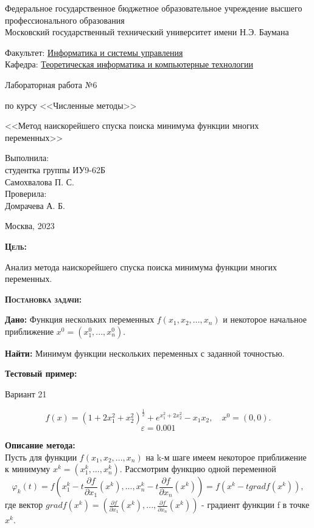 \documentclass [12pt]{article}
\title{}
\date{}
\author{}
\begin{document}
\begin{titlepage}
\thispagestyle{empty}
\begin{center}
Федеральное государственное бюджетное образовательное учреждение высшего профессионального образования \\Московский государственный технический университет имени Н.Э. Баумана

\end{center}
\bigskip
\begin{flushleft}
Факультет: \underline{Информатика и системы управления}\\
Кафедра: \underline{Теоретическая информатика и компьютерные технологии}
\end{flushleft}
\vfill
\centerline{\large{Лабораторная работа №6}}
\centerline{\large{по курсу <<Численные методы>>}}
\centerline{\large{<<Метод наискорейшего спуска поиска минимума функции многих переменных>>}}
\vfill
\hfill\parbox{5cm} {
           Выполнила:\\
           студентка группы ИУ9-62Б \hfill \\
           Самохвалова П. С.\hfill \medskip\\
           Проверила:\\
           Домрачева А. Б.\hfill
       }
\centerline{Москва, 2023}
\clearpage
\end{titlepage}

\textsc{\textbf{Цель:}}

Анализ метода наискорейшего спуска поиска минимума функции многих переменных.

\textsc{\textbf{Постановка задачи:}}

\textbf{Дано:}  Функция нескольких переменных $ f(x_{1}, x_{2}, ...,x_{n}) $ и некоторое начальное приближение $ x^{0} = (x_{1}^{0}, ..., x_{n}^{0}). $

\textbf{Найти:} Минимум функции нескольких переменных с заданной точностью.

\textbf{Тестовый пример:}

Вариант 21

$$f(x) = (1 + 2x_1^2 + x_2^2)^\frac{1}{2} + e^{x_1^2 + 2x_2^2} - x_1x_2, \quad x^{0} = (0, 0).$$
$$\varepsilon = 0.001$$

\textbf{Описание метода:}\\

Пусть для функции $f(x_{1}, x_{2}, ..., x_{n})$ на k-м шаге имеем некоторое приближение к минимуму $x^{k} = (x_{1}^{k},...,x_{n}^{k})$. Рассмотрим функцию одной переменной $$ \varphi_{k}(t) = f(x_{1}^k - t\frac{\partial f}{\partial x_{1}}(x^{k}),...,x_{n}^k - t\frac{\partial f}{\partial x_{n}}(x^{k})) = f(x^{k} - tgradf(x^{k})), $$ где вектор $ gradf(x^{k}) = (\frac{\partial f}{\partial x_{1}}(x^{k}),...,\frac{\partial f}{\partial x_{n}}(x^{k}) ) $ - градиент  функции f в точке $ x^{k}$.
\end{document}
